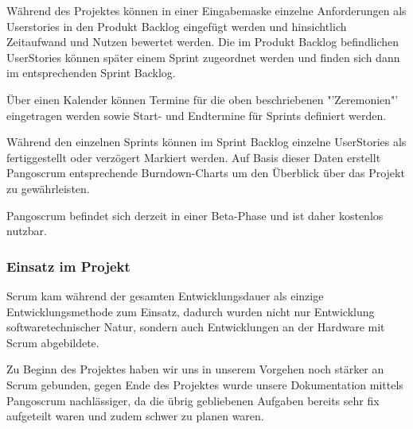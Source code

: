 Während des Projektes können in einer Eingabemaske einzelne Anforderungen als Userstories in den Produkt Backlog eingefügt werden und hinsichtlich Zeitaufwand und Nutzen bewertet werden. Die im Produkt Backlog befindlichen UserStories können später einem Sprint zugeordnet werden und finden sich dann im entsprechenden Sprint Backlog.

Über einen Kalender können Termine für die oben beschriebenen "'Zeremonien"' eingetragen werden sowie Start- und Endtermine für Sprints definiert werden.

Während den einzelnen Sprints können im Sprint Backlog einzelne UserStories als fertiggestellt oder verzögert Markiert werden. Auf Basis dieser Daten erstellt Pangoscrum entsprechende Burndown-Charts um den Überblick über das Projekt zu gewährleisten.

Pangoscrum befindet sich derzeit in einer Beta-Phase und ist daher kostenlos nutzbar.

\subsubsection{Einsatz im Projekt}
Scrum kam während der gesamten Entwicklungsdauer als einzige Entwicklungsmethode zum Einsatz, dadurch wurden nicht nur Entwicklung softwaretechnischer Natur, sondern auch Entwicklungen an der Hardware mit Scrum abgebildete. 

Zu Beginn des Projektes haben wir uns in unserem Vorgehen noch stärker an Scrum gebunden, gegen Ende des Projektes wurde unsere Dokumentation mittels Pangoscrum nachlässiger, da die übrig gebliebenen Aufgaben bereits sehr fix aufgeteilt waren und zudem schwer zu planen waren.